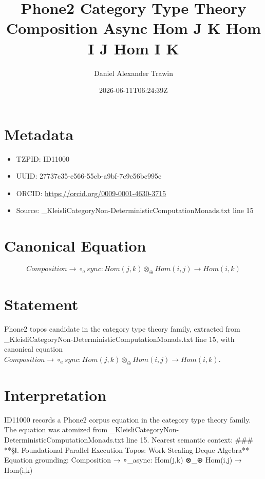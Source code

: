 \documentclass[11pt]{article}
\title{Phone2 Category Type Theory Composition Async Hom J K Hom I J Hom I K}
\author{Daniel Alexander Trawin}
\date{2026-06-11T06:24:39Z}
\begin{document}
\maketitle
\section*{Metadata}
\begin{itemize}
\item TZPID: ID11000
\item UUID: 27737c35-e566-55cb-a9bf-7c9e56bc995e
\item ORCID: \url{https://orcid.org/0009-0001-4630-3715}
\item Source: _KleisliCategoryNon-DeterministicComputationMonads.txt line 15
\end{itemize}
\section*{Canonical Equation}
\[
Composition → ∘_async: Hom(j,k) ⊗_⊕ Hom(i,j) → Hom(i,k)
\]
\section*{Statement}
Phone2 topos candidate in the category type theory family, extracted from _KleisliCategoryNon-DeterministicComputationMonads.txt line 15, with canonical equation $Composition → ∘_async: Hom(j,k) ⊗_⊕ Hom(i,j) → Hom(i,k)$.
\section*{Interpretation}
ID11000 records a Phone2 corpus equation in the category type theory family. The equation was atomized from _KleisliCategoryNon-DeterministicComputationMonads.txt line 15. Nearest semantic context: ### **§Ⅰ. Foundational Parallel Execution Topos: Work-Stealing Deque Algebra** Equation grounding: Composition → ∘_async: Hom(j,k) ⊗_⊕ Hom(i,j) → Hom(i,k)
\end{document}
